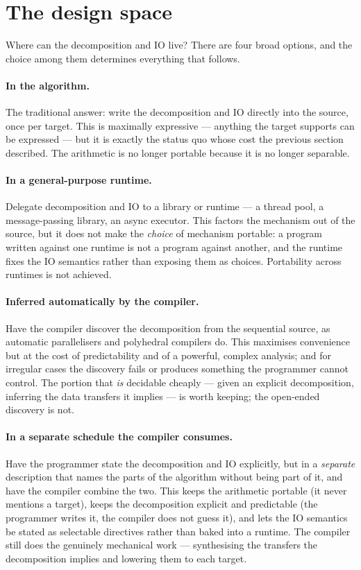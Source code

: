 \section{The design space}\label{sec:prob-design-space}

Where can the decomposition and IO live? There are four broad options, and the
choice among them determines everything that follows.

\paragraph{In the algorithm.} The traditional answer: write the decomposition
and IO directly into the source, once per target. This is maximally expressive
--- anything the target supports can be expressed --- but it is exactly the
status quo whose cost the previous section described. The arithmetic is no longer
portable because it is no longer separable.

\paragraph{In a general-purpose runtime.} Delegate decomposition and IO to a
library or runtime --- a thread pool, a message-passing library, an async
executor. This factors the mechanism out of the source, but it does not make the
\emph{choice} of mechanism portable: a program written against one runtime is
not a program against another, and the runtime fixes the IO semantics rather than
exposing them as choices. Portability across runtimes is not achieved.

\paragraph{Inferred automatically by the compiler.} Have the compiler discover
the decomposition from the sequential source, as automatic parallelisers and
polyhedral compilers do. This maximises convenience but at the cost of
predictability and of a powerful, complex analysis; and for irregular cases the
discovery fails or produces something the programmer cannot control. The portion
that \emph{is} decidable cheaply --- given an explicit decomposition, inferring
the data transfers it implies --- is worth keeping; the open-ended discovery is
not.

\paragraph{In a separate schedule the compiler consumes.} Have the programmer
state the decomposition and IO explicitly, but in a \emph{separate} description
that names the parts of the algorithm without being part of it, and have the
compiler combine the two. This keeps the arithmetic portable (it never mentions a
target), keeps the decomposition explicit and predictable (the programmer writes
it, the compiler does not guess it), and lets the IO semantics be stated as
selectable directives rather than baked into a runtime. The compiler still does
the genuinely mechanical work --- synthesising the transfers the decomposition
implies and lowering them to each target.

